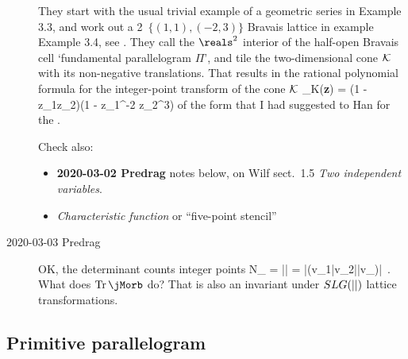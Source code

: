 \begin{description}
They start with the usual trivial example of a geometric series in
Example 3.3, and work out a 2\dmn\ $\{(1, 1),(-2, 3)\}$ Bravais lattice
in example Example 3.4, see . They call the
$\reals^2$ interior of the half-open Bravais cell `fundamental
parallelogram $\Pi$', and tile the two-dimensional cone ${\cal K}$ with
its non-negative translations. That results in the rational polynomial
formula for the integer-point transform of the cone ${\cal K}$
\beq
\sigma_{\cal K}({\bf z}) =
     {(1 - z_1z_2)(1 - z_1^{-2} z_2^3)}
of the form that I had suggested to Han for
the \catlatt.
\medskip

Check also:
\begin{itemize}
  \item
{\bf 2020-03-02 Predrag} notes below, on Wilf
sect.~1.5 {\em Two independent variables}.
  \item
\emph{Characteristic function} or ``five-point stencil''
\end{itemize}


\item[2020-03-03 Predrag]
OK,
the {\fundPip} determinant  counts integer points
\beq
N_\cl{} = |\Det\jMorb| = |\Det(v_1|v_2|\cdots|v_\cl{})|
\,.
What does
\(
\Tr\jMorb
\)
do? That is also an invariant under $SLG({||})$ lattice transformations.


\end{description}


\subsection{Primitive parallelogram}

